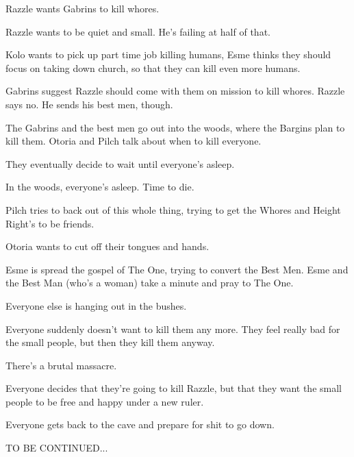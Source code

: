 Razzle wants Gabrins to kill whores.

Razzle wants to be quiet and small. He’s failing at half of that.

Kolo wants to pick up part time job killing humans, Esme thinks they should focus on taking down church, so that they can kill even more humans.

Gabrins suggest Razzle should come with them on mission to kill whores. Razzle says no. He sends his best men, though.

The Gabrins and the best men go out into the woods, where the Bargins plan to kill them. Otoria and Pilch talk about when to kill everyone.

They eventually decide to wait until everyone’s asleep.

In the woods, everyone’s asleep. Time to die.

Pilch tries to back out of this whole thing, trying to get the Whores and Height Right’s to be friends.

Otoria wants to cut off their tongues and hands.

Esme is spread the gospel of The One, trying to convert the Best Men. Esme and the Best Man (who’s a woman) take a minute and pray to The One.

Everyone else is hanging out in the bushes.

Everyone suddenly doesn’t want to kill them any more. They feel really bad for the small people, but then they kill them anyway.

There’s a brutal massacre.

Everyone decides that they’re going to kill Razzle, but that they want the small people to be free and happy under a new ruler.

Everyone gets back to the cave and prepare for shit to go down.

TO BE CONTINUED...



\clearpage